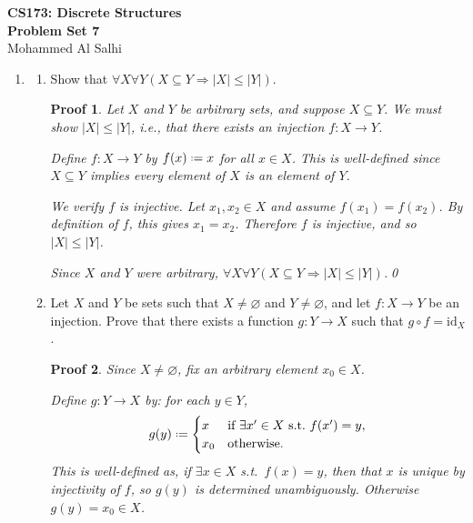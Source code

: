 \documentclass[12pt]{article}
\newcommand{\defeq}{\mathrel{\vcenter{\baselineskip0.5ex \lineskiplimit0pt
                     \hbox{\scriptsize.}\hbox{\scriptsize.}}}=}
\newcommand{\id}{\mathrm{id}}
\theoremstyle{proofstyle}
\newtheorem*{proof*}{Proof}
\renewcommand{\maketitle}{%
  \begin{flushleft}
    {\Large\bfseries CS173: Discrete Structures}\\[0.3em]
    {\Large\bfseries Problem Set 7}\\[0.5em]
    {\normalsize Mohammed Al Salhi}
  \end{flushleft}
  \vspace{1em}
}
\begin{document}
\maketitle

\begin{enumerate}[left=0pt, itemsep=2em, parsep=1em]

\item
\begin{enumerate}[label=(\alph*), itemsep=1.5em, leftmargin=2em]

  \item Show that $\forall X \forall Y (X \subseteq Y \Rightarrow |X| \leq |Y|)$.

  \begin{proof*}
  Let $X$ and $Y$ be arbitrary sets, and suppose $X \subseteq Y$. We must show $|X| \leq |Y|$, i.e., that there exists an injection $f : X \to Y$.

  Define $f : X \to Y$ by $f(x) \defeq x$ for all $x \in X$. This is well-defined since $X \subseteq Y$ implies every element of $X$ is an element of $Y$.

  We verify $f$ is injective. Let $x_1, x_2 \in X$ and assume $f(x_1) = f(x_2)$. By definition of $f$, this gives $x_1 = x_2$. Therefore $f$ is injective, and so $|X| \leq |Y|$.

  Since $X$ and $Y$ were arbitrary, $\forall X \forall Y (X \subseteq Y \Rightarrow |X| \leq |Y|)$.\qed
  \end{proof*}

  \item Let $X$ and $Y$ be sets such that $X \neq \varnothing$ and $Y \neq \varnothing$, and let $f : X \to Y$ be an injection. Prove that there exists a function $g : Y \to X$ such that $g \circ f = \id_X$.
 
  \begin{proof*}
  Since $X \neq \varnothing$, fix an arbitrary element $x_0 \in X$.
 
  Define $g : Y \to X$ by: for each $y \in Y$,
  \[
    g(y) \defeq \begin{cases} x & \text{if } \exists x' \in X \text{ s.t.\ } f(x') = y, \\ x_0 & \text{otherwise.} \end{cases}
  \]
  This is well-defined as, if $\exists x \in X$ s.t.\ $f(x) = y$, then that $x$ is unique by injectivity of $f$, so $g(y)$ is determined unambiguously. Otherwise $g(y) = x_0 \in X$.
 

\end{proof*}
\end{enumerate}
\end{enumerate}
\end{document}
